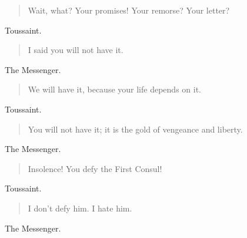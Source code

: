 \documentclass[letterpaper,article,12pt,oneside,notitlepage]{memoir}
\begin{document}
\begin{verse}
Wait, what? Your promises! Your remorse? Your letter? \\
\end{verse}

\begin{center}Toussaint.\end{center}

\begin{verse}
\hspace{1cm} I said you will not have it. \\
\end{verse}

\begin{center}The Messenger.\end{center}

\begin{verse}
\hspace{1cm} We will have it, because your life depends on it. \\
\end{verse}

\begin{center}Toussaint.\end{center}

\begin{verse}
\hspace{1cm} You will not have it; it is the gold of vengeance and liberty. \\
\end{verse}

\begin{center}The Messenger.\end{center}

\begin{verse}
\hspace{1cm} Insolence! You defy the First Consul! \\
\end{verse}

\begin{center}Toussaint.\end{center}

\begin{verse}
\hspace{1cm} I don't defy him. I hate him. \\
\end{verse}

\begin{center}The Messenger.\end{center}
\end{document}
